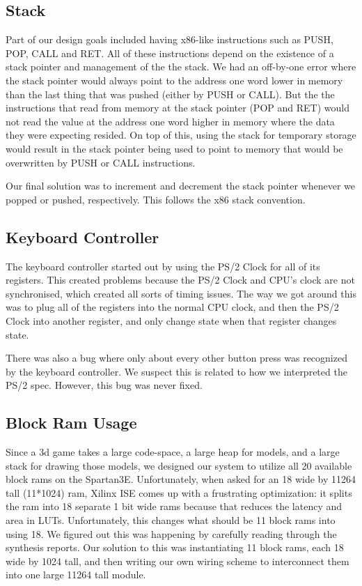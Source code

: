 \documentclass[onecolumn]{IEEEtran}
\begin{document}
\subsection{Stack}
Part of our design goals included having x86-like instructions such as PUSH, POP, CALL and RET.  All of these instructions depend on the existence of a stack pointer and management of the the stack.  We had an off-by-one error where the stack pointer would always point to the address one word lower in memory than the last thing that was pushed (either by PUSH or CALL).  But the the instructions that read from memory at the stack pointer (POP and RET) would not read the value at the address one word higher in memory where the data they were expecting resided.  On top of this, using the stack for temporary storage would result in the stack pointer being used to point to memory that would be overwritten by PUSH or CALL instructions.

Our final solution was to increment and decrement the stack pointer whenever we popped or pushed, respectively.  This follows the x86 stack convention.

\subsection{Keyboard Controller}
The keyboard controller started out by using the PS/2 Clock for all of its registers.  This created problems because the PS/2 Clock and CPU's clock are not synchronised, which created all sorts of timing issues.  The way we got around this was to plug all of the registers into the normal CPU clock, and then the PS/2 Clock into another register, and only change state when that register changes state.

There was also a bug where only about every other button press was recognized by the keyboard controller.  We suspect this is related to how we interpreted the PS/2 spec.  However, this bug was never fixed.
 
\subsection{Block Ram Usage}
Since a 3d game takes a large code-space, a large heap for models, and a large stack for drawing those models, we designed our system to utilize all 20 available block rams on the Spartan3E.  Unfortunately, when asked for an 18 wide by 11264 tall (11*1024) ram, Xilinx ISE comes up with a frustrating optimization: it splits the ram into 18 separate 1 bit wide rams because that reduces the latency and area in LUTs.  Unfortunately, this changes what should be 11 block rams into using 18.  We figured out this was happening by carefully reading through the synthesis reports.  Our solution to this was instantiating 11 block rams, each 18 wide by 1024 tall, and then writing our own wiring scheme to interconnect them into one large 11264 tall module.
\end{document}
